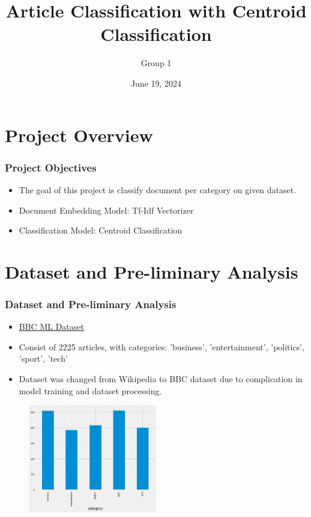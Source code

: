 \documentclass[
    10pt %
    16:9, %
]{beamer}
\title{Article Classification with Centroid Classification}
\subtitle{}
\author{Group 1}
\date[June 19, 2024]
 {June 19, 2024}
\begin{document}
\frame{\titlepage} %
\section[Outline]{}
\frame{\tableofcontents}

\section{Project Overview}
 
\frame %
{
  \frametitle{Project Objectives}
  \begin{itemize}
    \item The goal of this project is classify document per category on given dataset.
    \item Document Embedding Model: Tf-Idf Vectorizer
    \item Classification Model: Centroid Classification
  \end{itemize}
}
\section{Dataset and Pre-liminary Analysis}
\frame
{
  \frametitle{Dataset and Pre-liminary Analysis}
  \begin{itemize}
    \item \href{http://mlg.ucd.ie/datasets/bbc.html}{BBC ML Dataset}
    \item Consist of 2225 articles, with categories: 'business', 'entertainment', 'politics', 'sport', 'tech'
    \item Dataset was changed from Wikipedia to BBC dataset due to complication in model training and dataset processing.
  \end{itemize}
  \begin{figure}
    \centering
    \includegraphics[width=0.5\textwidth]{categories.png}
  \end{figure}
}
\end{document}
